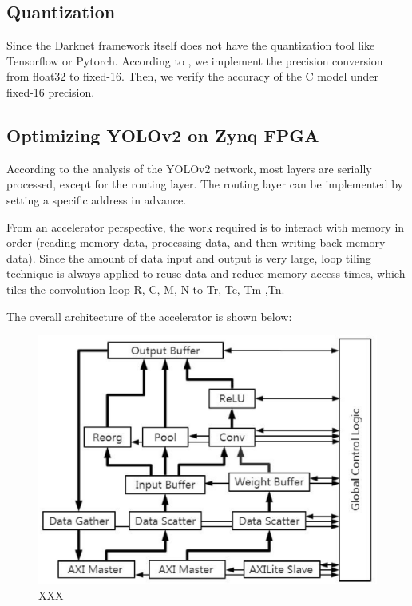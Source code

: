 \subsection{Quantization}
Since the Darknet framework itself does not have the quantization tool like Tensorflow or Pytorch. According to \cite{qiu2016going, shan2016dynamic}, we implement the precision conversion from float32 to fixed-16. Then, we verify the accuracy of the C model under fixed-16 precision.

\subsection{Optimizing YOLOv2 on Zynq FPGA}
According to the analysis of the YOLOv2 network, most layers are serially processed, except for the routing layer. The routing layer can be implemented by setting a specific address in advance. 

From an accelerator perspective, the work required is to interact with memory in order (reading memory data, processing data, and then writing back memory data). Since the amount of data input and output is very large, loop tiling technique is always applied to reuse data and reduce memory access times, which tiles the convolution loop R, C, M, N to Tr, Tc, Tm ,Tn\cite{zhang2015optimizing}.

The overall architecture of the accelerator is shown below:

\begin{figure}
\includegraphics[scale=0.43]{figure_2}
\caption{XXX}
\end{figure}

